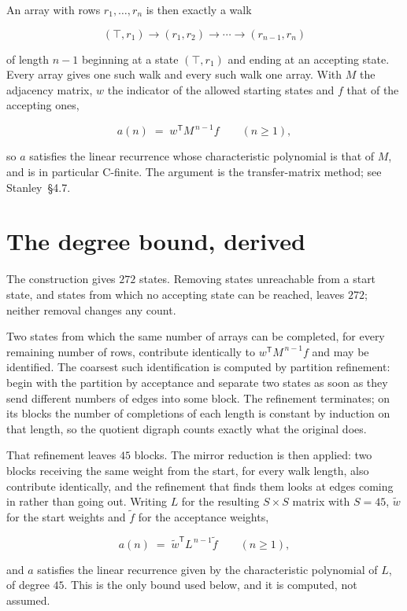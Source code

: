 \documentclass[11pt]{article}
\theoremstyle{definition}
\begin{document}
An array with rows $r_1,\dots,r_n$ is then exactly a walk

\[(\top,r_1) \to (r_1,r_2) \to \cdots \to (r_{n-1},r_n)\]

of length $n-1$ beginning at a state $(\top,r_1)$ and ending at an accepting state. Every array gives one such walk and every such walk one array. With $M$ the adjacency matrix, $w$ the indicator of the allowed starting states and $f$ that of the accepting ones,

\[a(n) \;=\; w^{\mathsf T} M^{\,n-1} f \qquad (n \ge 1),\]

so $a$ satisfies the linear recurrence whose characteristic polynomial is that of $M$, and is in particular C-finite. The argument is the transfer-matrix method; see Stanley~\S4.7.

\section{The degree bound, derived}

The construction gives $272$ states. Removing states unreachable from a start state, and states from which no accepting state can be reached, leaves $272$; neither removal changes any count.

Two states from which the same number of arrays can be completed, for every remaining number of rows, contribute identically to $w^{\mathsf T}M^{\,n-1}f$ and may be identified. The coarsest such identification is computed by partition refinement: begin with the partition by acceptance and separate two states as soon as they send different numbers of edges into some block. The refinement terminates; on its blocks the number of completions of each length is constant by induction on that length, so the quotient digraph counts exactly what the original does.

That refinement leaves $45$ blocks. The mirror reduction is then applied: two blocks receiving the same weight from the start, for every walk length, also contribute identically, and the refinement that finds them looks at edges coming in rather than going out. Writing $L$ for the resulting $S \times S$ matrix with $S = 45$, $\tilde w$ for the start weights and $\tilde f$ for the acceptance weights,

\[a(n) \;=\; \tilde w^{\mathsf T} L^{\,n-1} \tilde f \qquad (n \ge 1),\]

and $a$ satisfies the linear recurrence given by the characteristic polynomial of $L$, of degree $45$. This is the only bound used below, and it is computed, not assumed.
\end{document}
